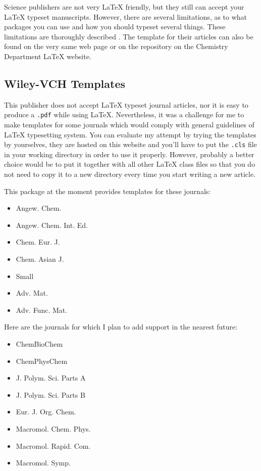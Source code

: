 Science publishers are not very \LaTeX{} friendly, but they still can accept
your \LaTeX{} typeset manuscripts.
%
However, there are several limitations, as to what packages you can use and how
you should typeset several things.
%
These limitations are thoroughly described
.
%
The template for their articles can also be found on the very same web page or
on the repository on the Chemistry Department \LaTeX{} website.

\subsection{Wiley-VCH Templates}

This publisher does not accept \LaTeX{} typeset journal articles, nor it is easy
to produce a \verb|.pdf| while using \LaTeX{}.
%
Nevertheless, it was a challenge for me to make templates for some journals
which would comply with general guidelines of \LaTeX{} typesetting system.
%
You can evaluate my attempt by trying the templates by yourselves, they are
hosted on this website and you'll have to put the \verb|.cls| file in your
working directory in order to use it properly.
%
However, probably a better choice would be to put it together with all other
\LaTeX{} class files so that you do not need to copy it to a new directory
every time you start writing a new article.

This package at the moment provides templates for these journals:
\begin{itemize}
    \item Angew. Chem.
    \item Angew. Chem. Int. Ed.
    \item Chem. Eur. J.
    \item Chem. Asian J.
    \item Small
    \item Adv. Mat.
    \item Adv. Func. Mat.
\end{itemize}

Here are the journals for which I plan to add support in the nearest future:
\begin{itemize}
    \item ChemBioChem
    \item ChemPhysChem
    \item J. Polym. Sci. Parts A
    \item J. Polym. Sci. Parts B
    \item Eur. J. Org. Chem.
    \item Macromol. Chem. Phys.
    \item Macromol. Rapid. Com.
    \item Macromol. Symp.
\end{itemize}

